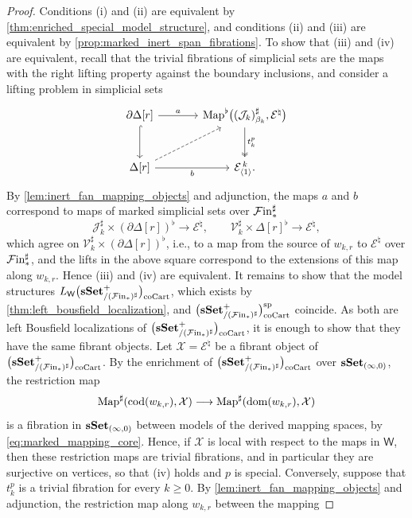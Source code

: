 \documentclass[10pt,reqno]{amsart}
\begin{document}
\begin{proof}
Conditions \textup{(i)} and \textup{(ii)} are equivalent by
\cref{thm:enriched_special_model_structure}, and conditions
\textup{(ii)} and \textup{(iii)} are equivalent by
\cref{prop:marked_inert_span_fibrations}. To show that \textup{(iii)}
and \textup{(iv)} are equivalent, recall that the trivial fibrations
of simplicial sets are the maps with the right lifting property
against the boundary inclusions, and consider a lifting problem in
simplicial sets
\[
\begin{tikzcd}[ampersand replacement=\&, sep=large]
\partial\Delta[r]\arrow[r,"a"]\arrow[d,hook]
\&\Map^\flat\bigl((\mathcal J_k)^\sharp_{\beta_k},
\mathcal E^\natural\bigr)\arrow[d,two heads,"t_k^p"]\\
\Delta[r]\arrow[r,"b"']\arrow[ur,dashed]
\&\mathcal E_{\langle1\rangle}^{\,k}.
\end{tikzcd}
\]
By \cref{lem:inert_fan_mapping_objects} and adjunction, the maps $a$
and $b$ correspond to maps of marked simplicial sets over
$\mathcal{F}\mathrm{in}_*^\sharp$
\[
\mathcal J_k^\sharp\times(\partial\Delta[r])^\flat
\longrightarrow\mathcal E^\natural,
\qquad
\mathcal V_k^\sharp\times\Delta[r]^\flat
\longrightarrow\mathcal E^\natural,
\]
which agree on $\mathcal V_k^\sharp\times(\partial\Delta[r])^\flat$,
i.e., to a map from the source of $w_{k,r}$ to $\mathcal E^\natural$
over $\mathcal{F}\mathrm{in}_*^\sharp$, and the lifts in the above square correspond
to the extensions of this map along $w_{k,r}$. Hence \textup{(iii)}
and \textup{(iv)} are equivalent. It remains to show that the model
structures $L_{\mathsf W}\bigl(\mathbf{sSet}^+_{/(\mathcal{F}\mathrm{in}_*)^\sharp}\bigr)_{\mathrm{coCart}}$, which exists by
\cref{thm:left_bousfield_localization}, and $\bigl(\mathbf{sSet}^+_{/(\mathcal{F}\mathrm{in}_*)^\sharp}\bigr)_{\mathrm{coCart}}^{\mathrm{sp}}$ coincide. As
both are left Bousfield localizations of $\bigl(\mathbf{sSet}^+_{/(\mathcal{F}\mathrm{in}_*)^\sharp}\bigr)_{\mathrm{coCart}}$, it is enough to
show that they have the same fibrant objects. Let
$\mathcal X=\mathcal E^\natural$ be a fibrant object of $\bigl(\mathbf{sSet}^+_{/(\mathcal{F}\mathrm{in}_*)^\sharp}\bigr)_{\mathrm{coCart}}$.
By the enrichment of $\bigl(\mathbf{sSet}^+_{/(\mathcal{F}\mathrm{in}_*)^\sharp}\bigr)_{\mathrm{coCart}}$ over $\mathbf{sSet}_{(\infty,0)}$, the
restriction map
\[
\operatorname{Map}^\sharp(\operatorname{cod}(w_{k,r}),\mathcal X)
\longrightarrow
\operatorname{Map}^\sharp(\operatorname{dom}(w_{k,r}),\mathcal X)
\]
is a fibration in $\mathbf{sSet}_{(\infty,0)}$ between models of the
derived mapping spaces, by \eqref{eq:marked_mapping_core}. Hence, if
$\mathcal X$ is local with respect to the maps in $\mathsf W$,
then these restriction maps are trivial fibrations, and in particular
they are surjective on vertices, so that \textup{(iv)} holds and
$p$ is special. Conversely, suppose that $t_k^p$ is a trivial fibration for
every $k\geq0$. By \cref{lem:inert_fan_mapping_objects} and
adjunction, the restriction map along $w_{k,r}$ between the mapping

\end{proof}
\end{document}
